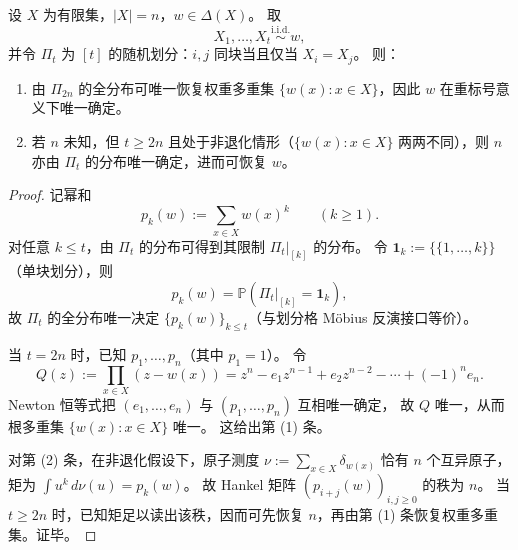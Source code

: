 \begin{theorem}[有限样本相等模式分布在 \texorpdfstring{$t=2n$}{t=2n} 的完备可识别性]\label{thm:xi-equality-pattern-2n-complete-identifiability}
设 \(X\) 为有限集，\(|X|=n\)，\(w\in\Delta(X)\)。
取
\[
X_1,\dots,X_t\stackrel{\mathrm{i.i.d.}}{\sim}w,
\]
并令 \(\Pi_t\) 为 \([t]\) 的随机划分：\(i,j\) 同块当且仅当 \(X_i=X_j\)。
则：
\begin{enumerate}
  \item 由 \(\Pi_{2n}\) 的全分布可唯一恢复权重多重集 \(\{w(x):x\in X\}\)，因此 \(w\) 在重标号意义下唯一确定。
  \item 若 \(n\) 未知，但 \(t\ge 2n\) 且处于非退化情形（\(\{w(x):x\in X\}\) 两两不同），则 \(n\) 亦由 \(\Pi_t\) 的分布唯一确定，进而可恢复 \(w\)。
\end{enumerate}
\end{theorem}
\begin{proof}
记幂和
\[
p_k(w):=\sum_{x\in X}w(x)^k\qquad(k\ge 1).
\]
对任意 \(k\le t\)，由 \(\Pi_t\) 的分布可得到其限制 \(\Pi_t|_{[k]}\) 的分布。
令 \(\mathbf 1_k:=\{\{1,\dots,k\}\}\)（单块划分），则
\[
p_k(w)=\mathbb P\!\left(\Pi_t|_{[k]}=\mathbf 1_k\right),
\]
故 \(\Pi_t\) 的全分布唯一决定 \(\{p_k(w)\}_{k\le t}\)（与划分格 Möbius 反演接口等价）。
\par
当 \(t=2n\) 时，已知 \(p_1,\dots,p_n\)（其中 \(p_1=1\)）。
令
\[
Q(z):=\prod_{x\in X}(z-w(x))
=z^n-e_1z^{n-1}+e_2z^{n-2}-\cdots+(-1)^n e_n.
\]
Newton 恒等式把 \((e_1,\dots,e_n)\) 与 \((p_1,\dots,p_n)\) 互相唯一确定，
故 \(Q\) 唯一，从而根多重集 \(\{w(x):x\in X\}\) 唯一。
这给出第 (1) 条。
\par
对第 (2) 条，在非退化假设下，原子测度
\(
\nu:=\sum_{x\in X}\delta_{w(x)}
\)
恰有 \(n\) 个互异原子，矩为 \(\int u^k\,d\nu(u)=p_k(w)\)。
故 Hankel 矩阵 \((p_{i+j}(w))_{i,j\ge 0}\) 的秩为 \(n\)。
当 \(t\ge 2n\) 时，已知矩足以读出该秩，因而可先恢复 \(n\)，再由第 (1) 条恢复权重多重集。证毕。
\end{proof}



\endinput
